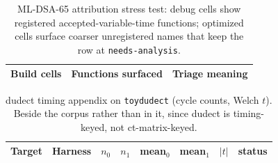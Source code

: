 \documentclass[runningheads]{llncs}
\renewcommand{\_}{\textunderscore\discretionary{}{}{}}
\begin{document}
\begin{table}[htbp]
\centering
\caption{ML-DSA-65 attribution stress test: debug cells show registered
accepted-variable-time functions; optimized cells surface coarser unregistered
names that keep the row at \texttt{needs-analysis}.}
\label{tab:mldsa}
\footnotesize
\setlength{\tabcolsep}{4pt}
\begin{tabular}{@{}>{\raggedright\arraybackslash}p{2.2cm}
                  >{\raggedright\arraybackslash}p{5.4cm}
                  >{\raggedright\arraybackslash}p{3.5cm}@{}}
\toprule
Build cells & Functions surfaced & Triage meaning\\
\midrule
%
\end{tabular}
\end{table}

\begin{table}[htbp]
\centering
\caption{dudect timing appendix on \texttt{toy\_dudect} (cycle counts, Welch
$t$). Beside the corpus rather than in it, since dudect is timing-keyed, not
ct-matrix-keyed.}
\label{tab:dudect}
\footnotesize
\begin{tabular}{@{}llrrrrrl@{}}
\toprule
Target & Harness & $n_0$ & $n_1$ & mean$_0$ & mean$_1$ & $|t|$ & status\\
\midrule
%
\end{tabular}
\end{table}









\end{document}
